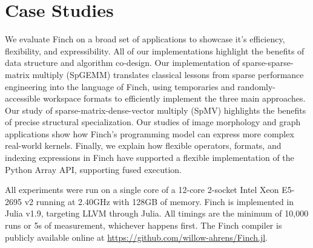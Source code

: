 
\section{Case Studies}

We evaluate Finch on a broad set of applications to showcase it's efficiency,
flexibility, and expressibility. All of our implementations highlight the
benefits of data structure and algorithm co-design.  Our implementation of
sparse-sparse-matrix multiply (SpGEMM) translates classical lessons from sparse
performance engineering into the language of Finch, using temporaries and
randomly-accessible workspace formats to efficiently implement the three main
approaches. Our study of sparse-matrix-dense-vector multiply (SpMV) highlights
the benefits of precise structural specialization. Our studies of image
morphology and graph applications show how Finch's programming model can express more complex
real-world kernels. Finally, we explain
how flexible operators, formats, and indexing expressions in Finch have
supported a flexible implementation of the Python Array API, supporting fused execution.

All experiments were run on a single core of a 12-core 2-socket Intel Xeon
E5-2695 v2 running at 2.40GHz with 128GB of memory. Finch is implemented in
Julia v1.9, targeting LLVM through Julia. All timings are the minimum of 10,000
runs or 5s of measurement, whichever happens first. The Finch compiler is
publicly available online at \url{https://github.com/willow-ahrens/Finch.jl}.





